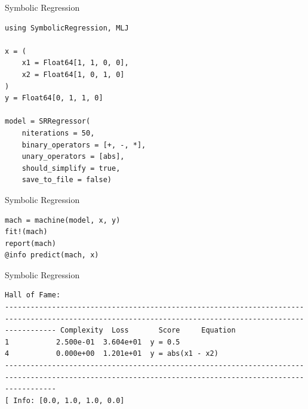 \documentclass[11pt]{beamer}
\begin{document}
\begin{frame}[fragile]{Symbolic Regression}
	\begin{lstlisting}
using SymbolicRegression, MLJ

x = (
	x1 = Float64[1, 1, 0, 0], 
	x2 = Float64[1, 0, 1, 0]
)
y = Float64[0, 1, 1, 0]

model = SRRegressor(
	niterations = 50,
	binary_operators = [+, -, *],
	unary_operators = [abs],
	should_simplify = true,
	save_to_file = false)

\end{lstlisting}
\end{frame}

\begin{frame}[fragile]{Symbolic Regression}
\begin{lstlisting}
mach = machine(model, x, y)
fit!(mach)
report(mach)
@info predict(mach, x)
\end{lstlisting}
\end{frame}


\begin{frame}[fragile]{Symbolic Regression}
\begin{lstlisting}
Hall of Fame:                                                                                                                                            -------------------------------------------------------------------------------------------------------------------------------------------------------- Complexity  Loss       Score     Equation                                                                                                                1           2.500e-01  3.604e+01  y = 0.5                                                                                                                4           0.000e+00  1.201e+01  y = abs(x1 - x2)                                                                                                       --------------------------------------------------------------------------------------------------------------------------------------------------------
[ Info: [0.0, 1.0, 1.0, 0.0]

\end{lstlisting}
\end{frame}
\end{document}
